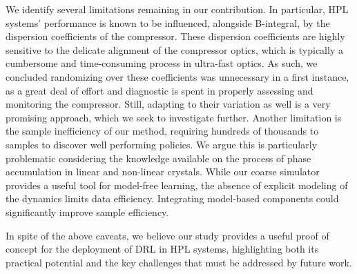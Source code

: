 
We identify several limitations remaining in our contribution. In particular, HPL systems' performance is known to be influenced, alongside B-integral, by the dispersion coefficients of the compressor. These dispersion coefficients are highly sensitive to the delicate alignment of the compressor optics, which is typically a cumbersome and time-consuming process in ultra-fast optics. As such, we concluded randomizing over these coefficients was unnecessary in a first instance, as a great deal of effort and diagnostic is spent in properly assessing and monitoring the compressor. Still, adapting to their variation as well is a very promising approach, which we seek to investigate further. \newline 
Another limitation is the sample inefficiency of our method, requiring hundreds of thousands to samples to discover well performing policies. We argue this is particularly problematic considering the knowledge available on the process of phase accumulation in linear and non-linear crystals. While our coarse simulator provides a useful tool for model-free learning, the absence of explicit modeling of the dynamics limits data efficiency. Integrating model-based components could significantly improve sample efficiency.

In spite of the above caveats, we believe our study provides a useful proof of concept for the deployment of DRL in HPL systems, highlighting both its practical potential and the key challenges that must be addressed by future work.